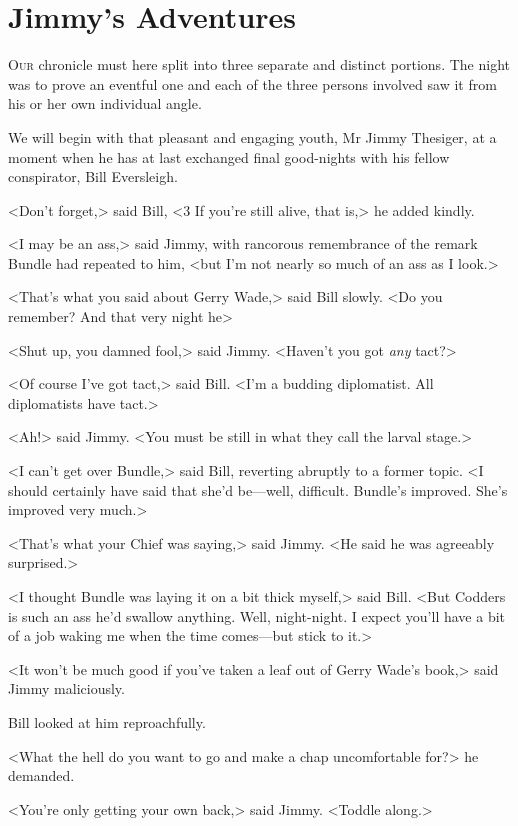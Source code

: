 \chapter{Jimmy's Adventures}

\lettrine{O}{ur} chronicle must here split into three separate and distinct portions. The night was to prove an eventful one and each of the three persons involved saw it from his or her own individual angle.

\zz
We will begin with that pleasant and engaging youth, Mr Jimmy Thesiger, at a moment when he has at last exchanged final good-nights with his fellow conspirator, Bill Eversleigh.

<Don't forget,> said Bill, <3  If you're still alive, that is,> he added kindly.

<I may be an ass,> said Jimmy, with rancorous remembrance of the remark Bundle had repeated to him, <but I'm not nearly so much of an ass as I look.>

<That's what you said about Gerry Wade,> said Bill slowly. <Do you remember? And that very night he\longdash>

<Shut up, you damned fool,> said Jimmy. <Haven't you got \emph{any} tact?>

<Of course I've got tact,> said Bill. <I'm a budding diplomatist. All diplomatists have tact.>

<Ah!> said Jimmy. <You must be still in what they call the larval stage.>

<I can't get over Bundle,> said Bill, reverting abruptly to a former topic. <I should certainly have said that she'd be—well, difficult. Bundle's improved. She's improved very much.>

<That's what your Chief was saying,> said Jimmy. <He said he was agreeably surprised.>

<I thought Bundle was laying it on a bit thick myself,> said Bill. <But Codders is such an ass he'd swallow anything. Well, night-night. I expect you'll have a bit of a job waking me when the time comes—but stick to it.>

<It won't be much good if you've taken a leaf out of Gerry Wade's book,> said Jimmy maliciously.

Bill looked at him reproachfully.

<What the hell do you want to go and make a chap uncomfortable for?> he demanded.

<You're only getting your own back,> said Jimmy. <Toddle along.>

